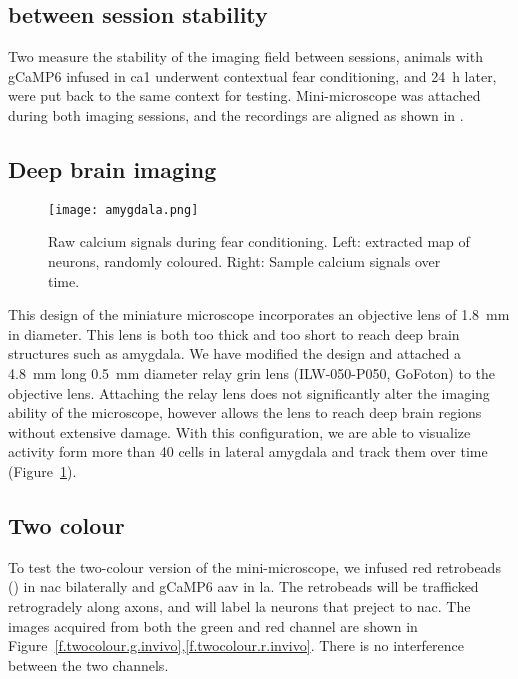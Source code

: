 \subsection{between session stability}
Two measure the stability of the imaging field between sessions, animals with gCaMP6 infused in \gls{ca1} underwent contextual fear conditioning, and \SI{24}{\hour} later, were put back to the same context for testing. Mini-microscope was attached during both imaging sessions, and the recordings are aligned as shown in . 

\subsection{Deep brain imaging}
\begin{figure}[h]
    \centering
    \texttt{[image: amygdala.png]}
    \caption{Raw calcium signals during fear conditioning. Left: extracted map of neurons, randomly coloured. Right: Sample calcium signals over time.\label{f.amygdala}}

\end{figure}
This design of the miniature microscope incorporates an objective lens of \SI{1.8}{\mm} in diameter. This lens is both too thick and too short to reach deep brain structures such as amygdala. We have modified the design and attached a \SI{4.8}{\mm} long \SI{0.5}{\mm} diameter relay \gls{grin} lens (ILW-050-P050, GoFoton) to the objective lens. Attaching the relay lens does not significantly alter the imaging ability of the microscope, however allows the lens to reach deep brain regions without extensive damage. With this configuration, we are able to visualize activity form more than 40 cells in lateral amygdala and track them over time (Figure~\ref{f.amygdala}).


\subsection{Two colour}
To test the two-colour version of the mini-microscope, we infused red retrobeads () in \gls{nac} bilaterally and gCaMP6 \gls{aav} in \gls{la}. The retrobeads will be trafficked retrogradely along axons, and will label \gls{la} neurons that preject to \gls{nac}. The images acquired from both the green and red channel are shown in Figure~\ref{f.twocolour.g.invivo},\ref{f.twocolour.r.invivo}. There is no interference between the two channels.

